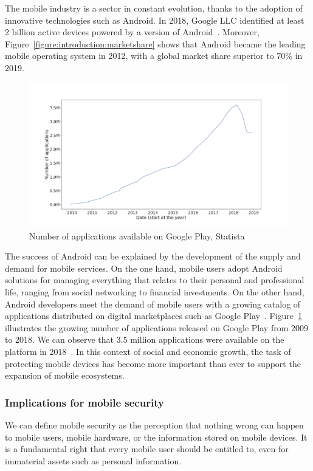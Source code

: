 The mobile industry is a sector in constant evolution, thanks to the adoption of innovative technologies such as Android.
In 2018, Google LLC identified at least 2 billion active devices powered by a version of Android~\cite{google_android_2018}.
Moreover, Figure~\ref{figure:introduction:marketshare} shows that Android became the leading mobile operating system in 2012, with a global market share superior to 70\% in 2019.

\begin{figure}[!ht]
        \centering
	\includegraphics[width=\linewidth]{figures/introduction/applications.pdf}
        \caption[Number of applications available on Google Play]{Number of applications available on Google Play, Statista~\cite{statista_number_2019}}
	\label{figure:introduction:applications}
\end{figure}

The success of Android can be explained by the development of the supply and demand for mobile services.
On the one hand, mobile users adopt Android solutions for managing everything that relates to their personal and professional life, ranging from social networking to financial investments.
On the other hand, Android developers meet the demand of mobile users with a growing catalog of applications distributed on digital marketplaces such as Google Play~\cite{google_google_2019}.
Figure~\ref{figure:introduction:applications} illustrates the growing number of applications released on Google Play from 2009 to 2018.
We can observe that 3.5 million applications were available on the platform in 2018~\cite{statista_number_2019}.
In this context of social and economic growth, the task of protecting mobile devices has become more important than ever to support the expansion of mobile ecosystems.
\subsubsection{Implications for mobile security}
We can define mobile security as the perception that nothing wrong can happen to mobile users, mobile hardware, or the information stored on mobile devices.
It is a fundamental right that every mobile user should be entitled to, even for immaterial assets such as personal information.

